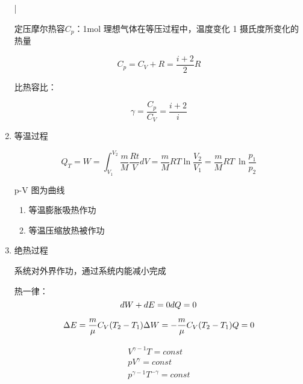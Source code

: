 \begin{enumerate}
          |

          定压摩尔热容$C_p$：1mol 理想气体在等压过程中，温度变化 1 摄氏度所变化的热量

          \begin{equation}
              C_p=C_V+R=\frac{i+2}{2}R
          \end{equation}

          比热容比：

          \begin{equation}
              \gamma{}=\frac{C_p}{C_V}=\frac{i+2}{i}
          \end{equation}

    \item 等温过程

          \begin{equation}
              Q_T=W=\int_{V_1}^{V_2}{\frac{m}{M}\frac{Rt}{V}dV}=\frac{m}{M}RT\ln\frac{V_2}{V_1}=\frac{m}{M}RT~\ln{\frac{p_1}{p_2}}
          \end{equation}

          p-V 图为曲线

          \begin{enumerate}
              \item 等温膨胀吸热作功
              \item 等温压缩放热被作功
          \end{enumerate}

    \item 绝热过程

          系统对外界作功，通过系统内能减小完成

          热一律：
          \begin{equation}
              dW+dE=0\\
              dQ=0
          \end{equation}

          \begin{equation}
              \Delta{E}=\frac{m}{\mu}C_V(T_2-T_1)\\
              \Delta{W}=-\frac{m}{\mu}C_V(T_2-T_1)\\
              Q=0
          \end{equation}

          \begin{equation}
              \begin{aligned}
                  V^{\gamma{}-1}T=\mathit{const} \\
                  pV^{\gamma}=\mathit{const}     \\
                  p^{\gamma{}-1}T^{-\gamma}=\mathit{const}
              \end{aligned}
          \end{equation}


\end{enumerate}
